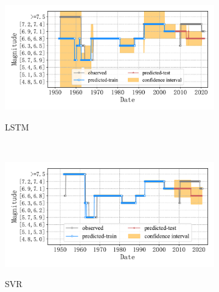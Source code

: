 \begin{figure}[!htbp]
  \vspace{-2cm}
  \centering
  \begin{subfigure}[b]{0.45\textwidth}
    \caption{LSTM}
    \includegraphics[width=\textwidth]{Img/chap5_seism/future10_class/seism_lstm_minyear_1932_maxyear_2021_spanlat_2_spanlon_4_timewindow_120_nextmonth_120_minmag_3.0_split_ratio_0.8_blocks1_class.pdf}
    \vspace{-1cm}
    \label{fig:seism_lstm_minyear_1932_maxyear_2021_spanlat_2_spanlon_4_timewindow_120_nextmonth_120_minmag_3.0_split_ratio_0.8_blocks1_class}
  \end{subfigure}
  ~
  \begin{subfigure}[b]{0.45\textwidth}
    \caption{SVR} 
    \includegraphics[width=\textwidth]{Img/chap5_seism/future10_class/seism_svr_minyear_1932_maxyear_2021_spanlat_2_spanlon_4_timewindow_120_nextmonth_120_minmag_3.0_split_ratio_0.8_blocks1_class.pdf}
    \vspace{-1cm}
    \label{fig:seism_svr_minyear_1932_maxyear_2021_spanlat_2_spanlon_4_timewindow_120_nextmonth_120_minmag_3.0_split_ratio_0.8_blocks1_class}
  \end{subfigure}   
  \\
  \begin{subfigure}[b]{0.45\textwidth}

\end{subfigure}
\end{figure}

